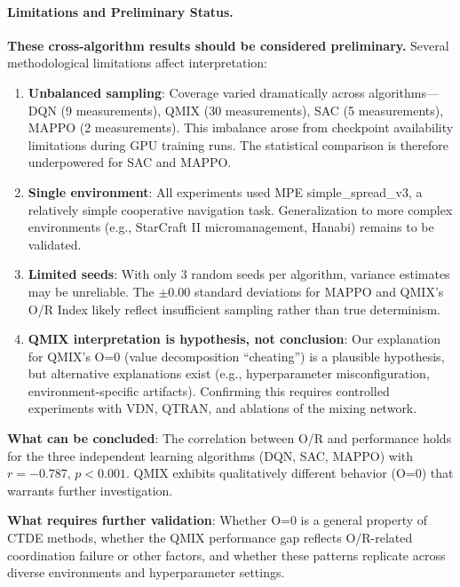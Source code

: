 \paragraph{Limitations and Preliminary Status.}
\textbf{These cross-algorithm results should be considered preliminary.} Several methodological limitations affect interpretation:

\begin{enumerate}
    \item \textbf{Unbalanced sampling}: Coverage varied dramatically across algorithms—DQN (9 measurements), QMIX (30 measurements), SAC (5 measurements), MAPPO (2 measurements). This imbalance arose from checkpoint availability limitations during GPU training runs. The statistical comparison is therefore underpowered for SAC and MAPPO.

    \item \textbf{Single environment}: All experiments used MPE simple\_spread\_v3, a relatively simple cooperative navigation task. Generalization to more complex environments (e.g., StarCraft II micromanagement, Hanabi) remains to be validated.

    \item \textbf{Limited seeds}: With only 3 random seeds per algorithm, variance estimates may be unreliable. The $\pm 0.00$ standard deviations for MAPPO and QMIX's O/R Index likely reflect insufficient sampling rather than true determinism.

    \item \textbf{QMIX interpretation is hypothesis, not conclusion}: Our explanation for QMIX's O=0 (value decomposition ``cheating'') is a plausible hypothesis, but alternative explanations exist (e.g., hyperparameter misconfiguration, environment-specific artifacts). Confirming this requires controlled experiments with VDN, QTRAN, and ablations of the mixing network.
\end{enumerate}

\noindent\textbf{What can be concluded}: The correlation between O/R and performance holds for the three independent learning algorithms (DQN, SAC, MAPPO) with $r = -0.787$, $p < 0.001$. QMIX exhibits qualitatively different behavior (O=0) that warrants further investigation.

\noindent\textbf{What requires further validation}: Whether O=0 is a general property of CTDE methods, whether the QMIX performance gap reflects O/R-related coordination failure or other factors, and whether these patterns replicate across diverse environments and hyperparameter settings.

